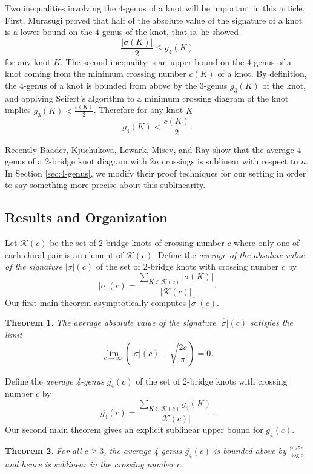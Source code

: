 \documentclass[12pt]{amsart}
\newtheorem{theorem}{Theorem}[section]
\theoremstyle{definition}
\theoremstyle{remark}
\numberwithin{equation}{section}
\begin{document}
Two inequalities involving the $4$-genus of a knot will be important in this article. First, Murasugi \cite{Mur:4genus} proved that half of the absolute value of the signature of a knot is a lower bound on the $4$-genus of the knot, that is, he showed 
\begin{equation}
    \label{eq:sigbound}
    \frac{|\sigma(K)|}{2} \leq g_4(K)
\end{equation}
for any knot $K$. The second inequality is an upper bound on the $4$-genus of a knot coming from the minimum crossing number $c(K)$ of a knot. By definition, the $4$-genus of a knot is bounded from above by the $3$-genus $g_3(K)$ of the knot, and applying Seifert's algorithm to a minimum crossing diagram of the knot implies $g_3(K)<\frac{c(K)}{2}$. Therefore for any knot $K$
\begin{equation}
    \label{eq:crossing}
    g_4(K) < \frac{c(K)}{2}.
\end{equation}
 

Recently Baader, Kjuchukova, Lewark, Misev, and Ray \cite{BKLMR} show that the average 4-genus of a 2-bridge knot diagram with $2n$ crossings is sublinear with respect to $n$.  In Section \ref{sec:4-genus}, we modify their proof techniques for our setting in order to say something more precise about this sublinearity.


\subsection{Results and Organization}
Let $\mathcal{K}(c)$ be the set of $2$-bridge knots of crossing number $c$ where only one of each chiral pair is an element of $\mathcal{K}(c)$. Define the \textit{average of the absolute value of the signature} $\overline{|\sigma|}(c)$ of the set of 2-bridge knots with crossing number $c$ by
\[\overline{|\sigma|}(c) = \frac{\sum_{K\in\mathcal{K}(c)} |\sigma(K)|}{|\mathcal{K}(c)|}.\]
Our first main theorem asymptotically computes $\overline{|\sigma|}(c)$.
\begin{theorem}
    \label{thm:avgsignature}
    The average absolute value of the signature $\overline{|\sigma|}(c)$  satisfies the limit 
    \[\lim_{c\to\infty}\left( \overline{|\sigma|}(c) - \sqrt{\frac{2c}{\pi}}\right) = 0.\]
\end{theorem}


Define the \textit{average 4-genus} $\overline{g_4}(c)$ of the set of 2-bridge knots with crossing number $c$ by 
\[\overline{g_4}(c) = \frac{\sum_{K\in\mathcal{K}(c)} g_4(K)}{|\mathcal{K}(c)|}.\]
Our second main theorem gives an explicit sublinear upper bound for $\overline{g_4}(c)$.
\begin{theorem}
\label{thm:avg4genus}
For all $c\geq 3$, the average 4-genus $\overline{g_4}(c)$ is bounded above by $\displaystyle\frac{9.75c}{\log c}$ and hence is sublinear in the crossing number $c$.
\end{theorem}
\end{document}

